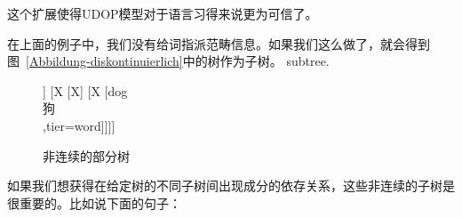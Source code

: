 这个扩展使得UDOP模型对于语言习得来说更为可信了。

在上面的例子中，我们没有给词指派范畴信息。如果我们这么做了，就会得到图~\vref{Abbildung-diskontinuierlich}中的树作为子树。
subtree.
\begin{figure}
\centering
\begin{forest}
[X
	[X
		[\gll watch\\
		看\\,tier=word]]
	[X
		[X]
		[X
			[\gll dog\\
			 狗\\,tier=word]]]]
\end{forest}
\caption{\label{Abbildung-diskontinuierlich}非连续的部分树}
\end{figure}%
如果我们想获得在给定树的不同子树间出现成分的依存关系，这些非连续的子树是很重要的。比如说下面的句子：

